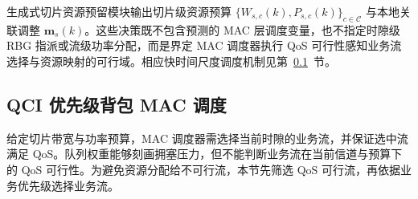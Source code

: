 生成式切片资源预留模块输出切片级资源预算 $\{W_{s,c}(k),P_{s,c}(k)\}_{c\in\mathcal C}$ 与本地关联调整 $\mathbf m_s(k)$。这些决策既不包含预测的 MAC 层调度变量，也不指定时隙级 RBG 指派或流级功率分配，而是界定 MAC 调度器执行 QoS 可行性感知业务流选择与资源映射的可行域。相应快时间尺度调度机制见第~\ref{subsec:ch4_mac}~节。

\subsection{QCI 优先级背包 MAC 调度}
\label{subsec:ch4_mac}

给定切片带宽与功率预算，MAC 调度器需选择当前时隙的业务流，并保证选中流满足 QoS。队列权重能够刻画拥塞压力，但不能判断业务流在当前信道与预算下的 QoS 可行性。为避免资源分配给不可行流，本节先筛选 QoS 可行流，再依据业务优先级选择业务流。

